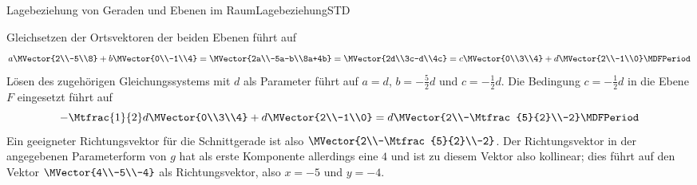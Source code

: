 \begin{MXContent}{Lagebeziehung von Geraden und Ebenen im Raum}{Lagebeziehung}{STD}
\begin{MExercise}
\begin{MHint}{\iSolution}
Gleichsetzen der Ortsvektoren der beiden Ebenen führt auf
\[
 a\MVector{2\\-5\\8}+b\MVector{0\\-1\\4}=\MVector{2a\\-5a-b\\8a+4b}=\MVector{2d\\3c-d\\4c}=c\MVector{0\\3\\4}+d\MVector{2\\-1\\0} \MDFPeriod
\]
Lösen des zugehörigen Gleichungssystems mit $d$ als Parameter führt auf $a=d$, $b=-\frac{5}{2}d$ und $c=-\frac{1}{2}d$. Die Bedingung $c=-\frac{1}{2}d$ in die Ebene $F$ eingesetzt führt auf
\[
 -\Mtfrac{1}{2}d\MVector{0\\3\\4}+d\MVector{2\\-1\\0}=d\MVector{2\\-\Mtfrac{5}{2}\\-2} \MDFPeriod
\]
Ein geeigneter Richtungsvektor für die Schnittgerade ist also $\MVector{2\\-\Mtfrac{5}{2}\\-2}$. Der Richtungsvektor in der angegebenen Parameterform von $g$ hat als erste Komponente allerdings eine $4$ und ist zu diesem Vektor also kollinear; dies führt auf den Vektor $\MVector{4\\-5\\-4}$ als Richtungsvektor, also $x=-5$ und $y=-4$. 
\end{MHint}


\end{MExercise}

\end{MXContent}




